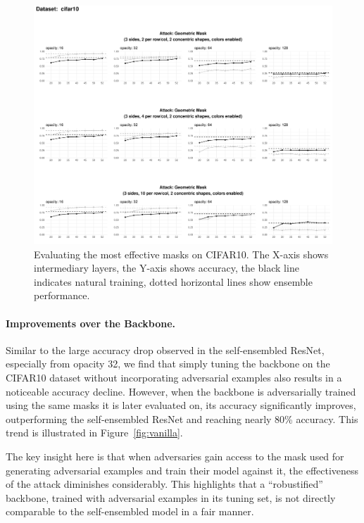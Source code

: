 \documentclass[a4paper, oneside]{discothesis}
\begin{document}
\begin{figure}
	\centering
	\includegraphics[width=1\columnwidth,keepaspectratio]{figures/self_ensemble_mask_final_cifar10.pdf}
	\caption{Evaluating the most effective masks on CIFAR10. The X-axis shows intermediary layers, the Y-axis shows accuracy, the black line indicates natural training, dotted horizontal lines show ensemble performance.}
	\label{fig:mask-effective}
\end{figure}

\paragraph{Improvements over the Backbone.}

Similar to the large accuracy drop observed in the self-ensembled ResNet, especially from opacity 32, we find that simply tuning the backbone on the CIFAR10 dataset without incorporating adversarial examples also results in a noticeable accuracy decline. However, when the backbone is adversarially trained using the same masks it is later evaluated on, its accuracy significantly improves, outperforming the self-ensembled ResNet and reaching nearly 80\% accuracy. This trend is illustrated in Figure~\ref{fig:vanilla}.

The key insight here is that when adversaries gain access to the mask used for generating adversarial examples and train their model against it, the effectiveness of the attack diminishes considerably. This highlights that a ``robustified'' backbone, trained with adversarial examples in its tuning set, is not directly comparable to the self-ensembled model in a fair manner.
\end{document}
